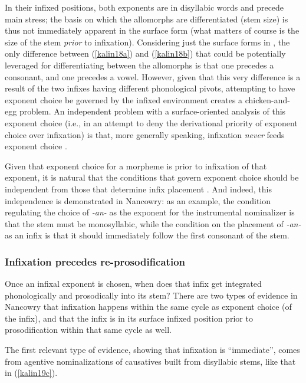 \documentclass[output=paper]{langscibook}
\begin{document}
\noindent In their infixed positions, both exponents are in disyllabic words and precede main stress; the basis on which the allomorphs are differentiated (stem size) is thus not immediately apparent in the surface form (what matters of course is the size of the stem \textit{prior} to infixation). Considering just the surface forms in \Last, the only difference between (\ref{kalin18a}) and (\ref{kalin18b}) that could be potentially leveraged for differentiating between the allomorphs is that one precedes a consonant, and one precedes a vowel. However, given that this very difference is a result of the two infixes having different phonological pivots, attempting to have exponent choice be governed by the infixed environment creates a chicken-and-egg problem. An independent problem with a surface-oriented analysis of this exponent choice (i.e., in an attempt to deny the derivational priority of exponent choice over infixation) is that, more  generally speaking, infixation {\it never} feeds exponent choice \citep{KalinIP}.  

Given that exponent choice for a morpheme is prior to infixation of that exponent, it is natural that the conditions that govern exponent choice should be independent from those that determine infix placement  \citep{KalinRolle21}. And indeed, this independence is demonstrated in Nancowry: as an example, the condition regulating the choice of \textit{-an-} as the exponent for the instrumental nominalizer is that the stem must be monosyllabic, while the condition on the placement of \textit{-an-} as an infix is that it should immediately follow the first consonant of the stem.

\subsubsection{Infixation precedes re-prosodification}\label{kalininford}\label{sec:kalin:4.2.2}

Once an infixal exponent is chosen, when does that infix get integrated phonologically and prosodically into its stem? There are two types of evidence in Nancowry that infixation happens within the same cycle as exponent choice (of the infix), and that the infix is in its surface infixed position prior to prosodification within that same cycle as well. 

The first relevant type of evidence, showing that infixation is ``immediate'', comes from agentive nominalizations of causatives built from disyllabic stems, like that in (\ref{kalin19c}).
\end{document}
